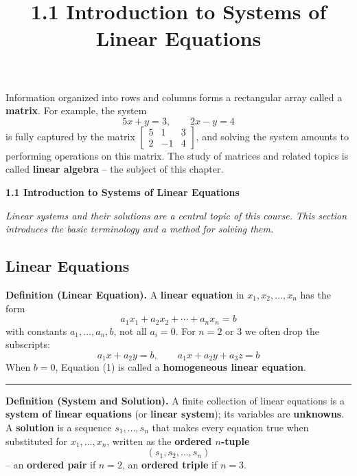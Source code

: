 \documentclass{article}
\title{1.1 Introduction to Systems of Linear Equations}
\date{}
\author{}
\newcommand{\redheading}[1]{{\vspace{2mm}\noindent\Large\bfseries\color{red!55!black} #1\par}\vspace{2mm}}
\theoremstyle{mystyle}
\begin{document}
\maketitle

\begin{tcolorbox}[colback=blue!5, colframe=blue!60!black, title=CHAPTER 1 OVERVIEW -- Systems of Linear Equations and Matrices, boxrule=0.5mm, arc=3mm]
Information organized into rows and columns forms a rectangular array called a \textbf{matrix}. For example, the system
\[
5x+y=3,\qquad 2x-y=4
\]
is fully captured by the matrix
\(
\begin{bmatrix} 5 & 1 & 3\\ 2 & -1 & 4\end{bmatrix}
\),
and solving the system amounts to performing operations on this matrix. The study of matrices and related topics is called \textbf{linear algebra} -- the subject of this chapter.
\end{tcolorbox}

\redheading{1.1 Introduction to Systems of Linear Equations}

{\itshape\color{blue!45!black}
Linear systems and their solutions are a central topic of this course. This section introduces the basic terminology and a method for solving them.\par}

\subsection*{Linear Equations}

\begin{tcolorbox}[
    colback=teal!4,
    colframe=teal!65!black,
    title=Definition \& Key Rules,
    fonttitle=\bfseries,
    boxrule=0.5mm,
    arc=3mm
    ]
    \textbf{\textcolor{teal!65!black}{Definition (Linear Equation).}}\quad
    A \textbf{linear equation} in $x_1,x_2,\dots,x_n$ has the form
    \[
    a_1x_1+a_2x_2+\cdots+a_nx_n=b \tag{1}
    \]
    with constants $a_1,\dots,a_n,b$, not all $a_i=0$. For $n=2$ or $3$ we often drop the subscripts:
    \[
    a_1x+a_2y=b,\qquad a_1x+a_2y+a_3z=b
    \]
    When $b=0$, Equation (1) is called a \textbf{homogeneous linear equation}.

    \noindent\textcolor{teal!50!black}{\rule{\linewidth}{0.4pt}}

    \textbf{\textcolor{teal!65!black}{Definition (System and Solution).}}\quad
    A finite collection of linear equations is a \textbf{system of linear equations} (or \textbf{linear system}); its variables are \textbf{unknowns}. A \textbf{solution} is a sequence $s_1,\dots,s_n$ that makes every equation true when substituted for $x_1,\dots,x_n$, written as the \textbf{ordered $n$-tuple}
    \[
    (s_1,s_2,\dots,s_n)
    \]
    -- an \textbf{ordered pair} if $n=2$, an \textbf{ordered triple} if $n=3$.
\end{tcolorbox}
\end{document}
